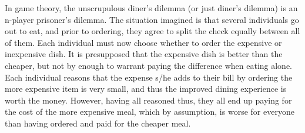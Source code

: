 In game theory, the unscrupulous diner's dilemma (or just diner's dilemma) is an n-player prisoner's dilemma. The situation imagined is that several individuals go out to eat, and prior to ordering, they agree to split the check equally between all of them. Each individual must now choose whether to order the expensive or inexpensive dish. It is presupposed that the expensive dish is better than the cheaper, but not by enough to warrant paying the difference when eating alone. Each individual reasons that the expense s/he adds to their bill by ordering the more expensive item is very small, and thus the improved dining experience is worth the money. However, having all reasoned thus, they all end up paying for the cost of the more expensive meal, which by assumption, is worse for everyone than having ordered and paid for the cheaper meal.

